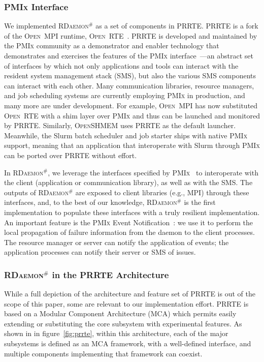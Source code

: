 \documentclass[sigconf]{acmart}
\newcommand{\prrte}[0]{\textsc{PRRTE}\xspace}
\newcommand{\pmix}[0]{\textsc{PMIx}\xspace}
\newcommand{\orte}[0]{\textsc{Open~RTE}\xspace}
\newcommand{\ompi}[0]{\textsc{Open~MPI}\xspace}
\newcommand{\oshmem}[0]{\textsc{OpenSHMEM}\xspace}
\newcommand{\ourwork}[0]{\textsc{RDaemon}\ensuremath{^\#}\xspace}
\begin{document}
\subsubsection{\pmix Interface}
We implemented \ourwork as a set of components in \prrte. \prrte is a fork of the \ompi runtime, \orte~\cite{Castain05}. \prrte is developed and maintained
by the \pmix community as a demonstrator and enabler technology that demonstrates
and exercises the features of the \pmix interface~\cite{CASTAIN18}---an abstract set of interfaces by which not only applications and tools can interact with the resident system management stack (SMS), but also the various SMS components can interact with each other.
Many communication libraries, resource managers, and job scheduling systems are currently employing \pmix in production, and many more are under development.
For example, \ompi has now substituted \orte with a shim layer over \pmix and thus can be launched and monitored by \prrte.
Similarly, \oshmem uses \prrte as the default launcher.
Meanwhile, the Slurm batch scheduler and job starter ships with native \pmix support, meaning that an application that interoperate with Slurm through \pmix can be ported  over \prrte without effort.

In \ourwork, we leverage the interfaces specified by \pmix~\cite{Ralph15} to interoperate 
with the client (application or communication library), as well as with the 
SMS. 
The outputs of \ourwork are exposed to client libraries (e.g., MPI) through
these interfaces, and, to the best of our knowledge, \ourwork is the first
implementation to populate these interfaces with a truly resilient implementation.
An important feature is the \pmix Event Notification~\cite{Ralph002}: 
we use it to perform the local propagation of failure information from the 
daemon to the client processes. The resource manager or server can notify the application of events; the application processes can notify their server or SMS of issues.

\subsubsection{\ourwork in the \prrte Architecture}

While a full depiction of the architecture and feature set of \prrte is out of the scope of this paper, some are relevant to our implementation effort.
\prrte is based on a Modular Component Architecture (MCA) which permits easily extending or substituting the core subsystem with experimental features.
As shown in in figure~\ref{fig:prrte}, within this architecture, each of the major subsystems is defined as an MCA framework, with a well-defined interface, and multiple components implementing that framework can coexist.
\end{document}
